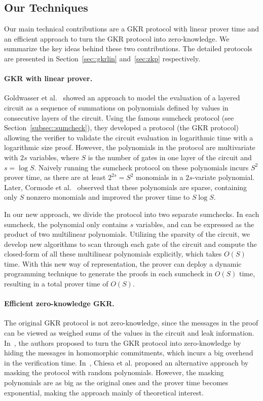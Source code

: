 \subsection{Our Techniques}
Our main technical contributions are a GKR protocol with linear prover time and an efficient approach to turn the GKR protocol into zero-knowledge. We summarize the key ideas behind these two contributions. The detailed protocols are presented in Section~\ref{sec::gkrlin} and~\ref{sec:zkp} respectively.

\paragraph{GKR with linear prover.} Goldwasser et al.~\cite{GKR} showed an approach to model the evaluation of a layered circuit as a sequence of summations on polynomials defined by values in consecutive layers of the circuit. Using the famous sumcheck protocol (see Section~\ref{subsec::sumcheck}), they developed a protocol (the GKR protocol) allowing the verifier to validate the circuit evaluation in logarithmic time with a logarithmic size proof. However, the polynomials in the protocol are multivariate with $2s$ variables, where $S$ is the number of gates in one layer of the circuit and $s = \log S$. Naively running the sumcheck protocol on these polynomials incurs $S^2$ prover time, as there are at least $2^{2s}=S^2$ monomials in a $2s$-variate polynomial. Later, Cormode et al.~\cite{CMT} observed that these polynomials are sparse, containing only $S$ nonzero monomials and improved the prover time to $S\log S$.

In our new approach, we divide the protocol into two separate sumchecks. In each sumcheck, the polynomial only contains $s$ variables, and can be expressed as the product of two multilinear polynomials. Utilizing the sparsity of the circuit, we develop new algorithms to scan through each gate of the circuit and compute the closed-form of all these multilinear polynomials explicitly, which takes $O(S)$ time. With this new way of representation, the prover can deploy a dynamic programming technique to generate the proofs in each sumcheck in $O(S)$ time, resulting in a total prover time of $O(S)$. 

\paragraph{Efficient zero-knowledge GKR.} The original GKR protocol is not zero-knowledge, since the messages in the proof can be viewed as weighed sums of the values in the circuit and leak information. In~\cite{zkvpd,hyrax}, the authors proposed to turn the GKR protocol into zero-knowledge by hiding the messages in homomorphic commitments, which incurs a big overhead in the verification time. In~\cite{zksumcheck}, Chiesa et al. proposed an alternative approach by masking the protocol with random polynomials. However, the masking polynomials are as big as the original ones and the prover time becomes exponential, making the approach mainly of theoretical interest. 

